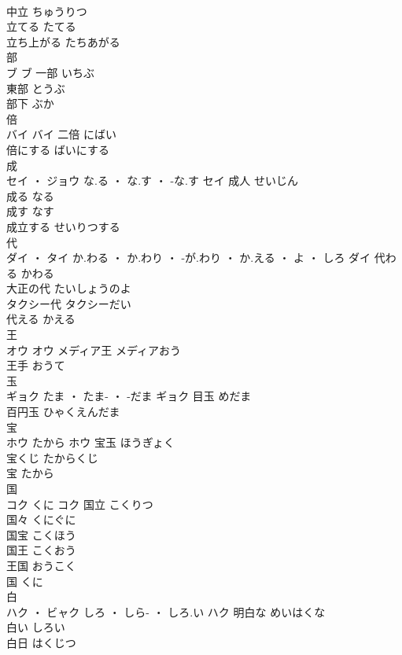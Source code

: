 \documentclass[8pt]{extreport}
\begin{document}
\begin{CJK}{UTF8}{min}
\\	中立	ちゅうりつ	
\\	立てる	たてる	
\\	立ち上がる	たちあがる	
\\	部	
\\	ブ		ブ	一部	いちぶ	
\\	東部	とうぶ	
\\	部下	ぶか	
\\	倍	
\\	バイ		バイ	二倍	にばい	
\\	倍にする	ばいにする	
\\	成	
\\	セイ ・ ジョウ	な.る ・ な.す ・ -な.す	セイ	成人	せいじん	
\\	成る	なる	
\\	成す	なす	
\\	成立する	せいりつする	
\\	代	
\\	ダイ ・ タイ	か.わる ・ か.わり ・ -が.わり ・ か.える ・ よ ・ しろ	ダイ	代わる	かわる	
\\	大正の代	たいしょうのよ	
\\	タクシー代	タクシーだい	
\\	代える	かえる	
\\	王	
\\	オウ		オウ													メディア王	メディアおう	
\\	王手	おうて	
\\	玉	
\\	ギョク	たま ・ たま- ・ -だま	ギョク													目玉	めだま	
\\	百円玉	ひゃくえんだま	
\\	宝	
\\	ホウ	たから	ホウ	宝玉	ほうぎょく	
\\	宝くじ	たからくじ	
\\	宝	たから	
\\	国	
\\	コク	くに	コク	国立	こくりつ	
\\	国々	くにぐに	
\\	国宝	こくほう	
\\	国王	こくおう	
\\	王国	おうこく	
\\	国	くに	
\\	白	
\\	ハク ・ ビャク	しろ ・ しら- ・ しろ.い	ハク	明白な	めいはくな	
\\	白い	しろい	
\\	白日	はくじつ	

\end{CJK}
\end{document}
